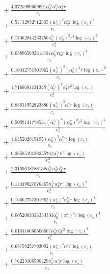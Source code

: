 \documentclass[10pt]{article}
\begin{document}
\begin{align*}
&{}  + \frac{4.3725999669691 \alpha_{0}^{c_s} \alpha_{1}^{c_s} \alpha_{1}^s r}{c_{s}} \\
&{}  + \frac{0.54732932712305 \left(\alpha_{0}^s\right)^{2} \alpha_{2}^s r \log{\left(c_{s} \right)}^{2}}{c_{s}} \\
&{}  + \frac{0.17462844233256 \alpha_{0}^{c_s} \left(\alpha_{0}^s\right)^{2} r^{3} \log{\left(c_{s} \right)}^{2}}{c_{s}^{3}} \\
&{}  + \frac{0.088965892613781 \alpha_{0}^{c_s} \alpha_{3}^s r \log{\left(c_{s} \right)}^{3}}{c_{s}} \\
&{}  + \frac{0.10412751301962 \left(\alpha_{0}^{c_s}\right)^{3} \left(\alpha_{0}^s\right)^{2} r \log{\left(c_{s} \right)}^{2}}{c_{s}} \\
&{}  + \frac{1.7168681131348 \left(\alpha_{0}^{c_s}\right)^{2} \alpha_{1}^s r^{2} \log{\left(c_{s} \right)}}{c_{s}^{2}} \\
&{}  + \frac{0.88931952823886 \left(\alpha_{0}^{c_s}\right)^{3} \alpha_{1}^s r \log{\left(c_{s} \right)}}{c_{s}} \\
&{}  + \frac{0.5099131778531 \left(\alpha_{0}^{c_s}\right)^{2} \left(\alpha_{0}^s\right)^{2} r^{2} \log{\left(c_{s} \right)}^{2}}{c_{s}^{2}} \\
&{}  + \frac{1.045202875195 \left(\alpha_{0}^s\right)^{3} \alpha_{1}^{c_s} r \log{\left(c_{s} \right)}}{c_{s}} \\
&{}  + \frac{0.26585191262557 \alpha_{0}^s \alpha_{1}^{c_s} r^{3} \log{\left(c_{s} \right)}}{c_{s}^{3}} \\
&{}  + \frac{2.3109618188138 \alpha_{0}^{c_s} \alpha_{0}^s \alpha_{2}^{c_s} r}{c_{s}} \\
&{}  + \frac{0.14449027076465 \alpha_{1}^{c_s} \alpha_{1}^s r^{2} \log{\left(c_{s} \right)}^{2}}{c_{s}^{2}} \\
&{}  + \frac{0.16662751301962 \left(\alpha_{0}^s\right)^{2} \alpha_{2}^{c_s} r \log{\left(c_{s} \right)}^{2}}{c_{s}} \\
&{}  + \frac{0.0052083333333333 \alpha_{0}^{c_s} \left(\alpha_{0}^s\right)^{4} r \log{\left(c_{s} \right)}^{4}}{c_{s}} \\
&{}  + \frac{0.010416666666667 \alpha_{0}^s \alpha_{2}^s r^{2} \log{\left(c_{s} \right)}^{4}}{c_{s}^{2}} \\
&{}  + \frac{0.68758257793092 \left(\alpha_{0}^s\right)^{3} \alpha_{1}^s r \log{\left(c_{s} \right)}}{c_{s}} \\
&{}  + \frac{0.76223106590429 \alpha_{0}^{c_s} \alpha_{3}^s r \log{\left(c_{s} \right)}}{c_{s}} \\

\end{align*}
\end{document}
